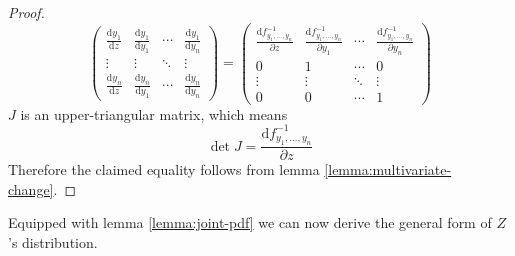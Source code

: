 \documentclass[11pt,a4paper]{book}
\begin{document}
\begin{proof}
\begin{equation*}
\begin{pmatrix}
      \frac{\mathrm{d} y_{1}}{\mathrm{d} z} & \frac{\mathrm{d} y_{1}}{\mathrm{d} y_{1}} & \cdots & \frac{\mathrm{d} y_{1}}{\mathrm{d} y_{n}}\\
      \vdots & \vdots & \ddots & \vdots\\
      \frac{\mathrm{d} y_{n}}{\mathrm{d} z} & \frac{\mathrm{d} y_{n}}{\mathrm{d} y_{1}} & \cdots & \frac{\mathrm{d} y_{n}}{\mathrm{d} y_{n}}
    \end{pmatrix}
    =
    \begin{pmatrix}
      \frac{\mathrm{d}f_{y_{1}, \dots, y_{n}}^{-1}}{\partial z} & \frac{\mathrm{d}f_{y_{1}, \dots, y_{n}}^{-1}}{\partial y_{1}} & \cdots & \frac{\mathrm{d}f_{y_{1}, \dots, y_{n}}^{-1}}{\partial y_{n}}\\
      0 & 1 & \cdots & 0\\
      \vdots & \vdots & \ddots & \vdots\\
      0 & 0 & \cdots & 1
    \end{pmatrix}
  \end{equation*}
  $J$ is an upper-triangular matrix, which means
  \begin{equation*}
    \det J = \frac{\mathrm{d}f_{y_{1}, \dots, y_{n}}^{-1}}{\partial z}
  \end{equation*}
  Therefore the claimed equality follows from lemma \ref{lemma:multivariate-change}.
\end{proof}

Equipped with lemma \ref{lemma:joint-pdf} we can now derive the general form of
$Z$'s distribution.
\end{document}
